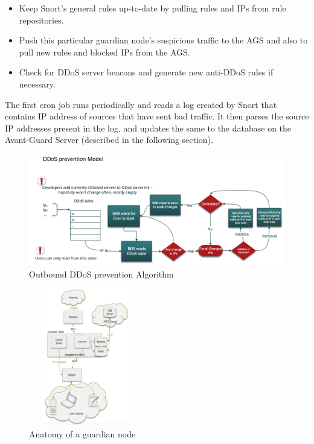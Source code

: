 \begin{itemize}
    \item Keep Snort's general rules up-to-date by pulling rules and IPs from rule repositories.
    \item Push this particular guardian node's suspicious traffic to the AGS and also to pull new rules and blocked IPs from the AGS.
    \item Check for DDoS server beacons and generate new anti-DDoS rules if necessary.
\end{itemize}

The first cron job runs periodically and reads a log created by Snort that contains IP address of sources that have sent bad traffic. It then parses the source IP addresses present in the log, and updates the same to the database on the Avant-Guard Server (described in the following section). \\

\begin{figure}
    \centering
    \includegraphics[width=0.95\linewidth]{figs/ddostable.png}
    \caption{Outbound DDoS prevention Algorithm}
    \label{fig:ddostable}
\end{figure}

\begin{figure}
    \centering
    \includegraphics[width=5cm, height=6cm]{figs/guardiannode.png}
    \caption{Anatomy of a guardian node}
    \label{fig:guardian}
\end{figure}

